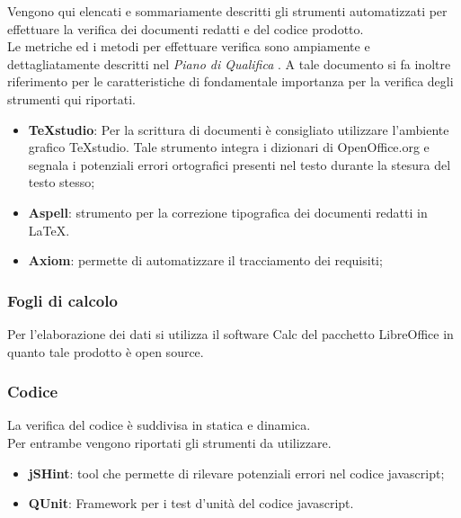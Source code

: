 Vengono qui elencati e sommariamente descritti gli strumenti automatizzati per effettuare la verifica dei documenti redatti e del codice prodotto.\\ 
Le metriche ed i metodi per effettuare verifica sono ampiamente e dettagliatamente descritti nel \emph{Piano di Qualifica} . A tale documento si fa inoltre riferimento per le 
caratteristiche di fondamentale importanza per la verifica degli strumenti qui riportati. 

\begin{itemize}
\item \textbf{TeXstudio}: Per la scrittura di documenti è consigliato utilizzare l’ambiente grafico TeXstudio. Tale strumento integra i dizionari di OpenOffice.org e segnala i potenziali errori ortografici presenti nel 
testo durante la stesura del testo stesso; 
\item \textbf{Aspell}: strumento per la correzione tipografica dei documenti redatti in \LaTeX. 
\item \textbf{Axiom}: permette di automatizzare il tracciamento dei requisiti; 
\end{itemize} 


\subsubsection{Fogli di calcolo}
Per l’elaborazione dei dati si utilizza il software Calc del pacchetto LibreOffice in quanto
tale prodotto è open source.


\subsubsection{Codice} 

La verifica del codice è suddivisa in statica e dinamica.\\ 
Per entrambe vengono riportati gli strumenti da utilizzare. 


  \begin{itemize}
  \item \textbf{jSHint}: tool che permette di rilevare potenziali errori nel codice javascript;
  \item \textbf{QUnit}: Framework per i test d'unità del codice javascript.
  \end{itemize}




